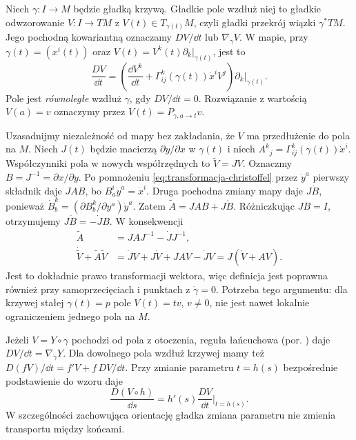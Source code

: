 \begin{definicja}
\label{def:pochodna-wzdluz-krzywej}
Niech $\gamma:I\to M$ będzie gładką krzywą.
Gładkie pole wzdłuż niej to gładkie odwzorowanie
$V:I\to TM$ z $V(t)\in T_{\gamma(t)}M$,
czyli gładki przekrój wiązki $\gamma^*TM$.
Jego pochodną kowariantną oznaczamy
$D V/\dd t$ lub $\nabla_{\dot\gamma}V$.
W mapie, przy $\gamma(t)=(x^i(t))$ oraz
$V(t)=V^k(t)\partial_k|_{\gamma(t)}$, jest to
\begin{equation}\label{eq:pochodna-kowariantna-krzywa}
 \frac{D V}{\dd t}
 =\left(\frac{\dd V^k}{\dd t}
   +\Gamma^k_{ij}(\gamma(t))\dot x^i V^j\right)
    \partial_k\big|_{\gamma(t)}.
\end{equation}
Pole jest \emph{równoległe} wzdłuż $\gamma$,
gdy $DV/\dd t=0$. Rozwiązanie z wartością
$V(a)=v$ oznaczymy przez $V(t)=P_{\gamma,a\to t}v$.
\end{definicja}

Uzasadnijmy niezależność od mapy bez zakładania, że $V$
ma przedłużenie do pola na $M$. Niech $J(t)$ będzie macierzą
$\partial y/\partial x$ w $\gamma(t)$ i niech
$A^k{}_j=\Gamma^k_{ij}(\gamma(t))\dot x^i$.
Współczynniki pola w nowych współrzędnych to
$\widetilde V=JV$. Oznaczmy $B=J^{-1}=\partial x/\partial y$.
Po pomnożeniu \eqref{eq:transformacja-christoffel} przez
$\dot y^a$ pierwszy składnik daje $JAB$, bo
$B^i_a\dot y^a=\dot x^i$. Druga pochodna zmiany mapy
daje $J\dot B$, ponieważ
$\dot B^k_b=(\partial B^k_b/\partial y^a)\dot y^a$.
Zatem $\widetilde A=JAB+J\dot B$.
Różniczkując $JB=I$, otrzymujemy
$J\dot B=-\dot J B$. W konsekwencji
\begin{align*}
 \widetilde A&=JAJ^{-1}-\dot J J^{-1},\\
 \dot{\widetilde V}+\widetilde A\widetilde V
 &=\dot J V+J\dot V+JAV-\dot J V
 =J(\dot V+AV).
\end{align*}
Jest to dokładnie prawo transformacji wektora, więc definicja
jest poprawna również przy samoprzecięciach i punktach
z $\dot\gamma=0$. Potrzeba tego argumentu: dla krzywej
stałej $\gamma(t)=p$ pole $V(t)=t v$, $v\ne0$, nie jest
nawet lokalnie ograniczeniem jednego pola na $M$.

Jeżeli $V=Y\circ\gamma$ pochodzi od pola z otoczenia,
reguła łańcuchowa (por. ) daje $DV/\dd t=\nabla_{\dot\gamma}Y$.
Dla dowolnego pola wzdłuż krzywej mamy też
$D(fV)/\dd t=f'V+f\,DV/\dd t$. Przy zmianie parametru
$t=h(s)$ bezpośrednie podstawienie do wzoru daje
\begin{equation}\label{eq:transport-reparametryzacja}
 \frac{D(V\circ h)}{\dd s}
   =h'(s)\frac{DV}{\dd t}\bigg|_{t=h(s)}.
\end{equation}
W szczególności zachowująca orientację gładka zmiana
parametru nie zmienia transportu między końcami.

